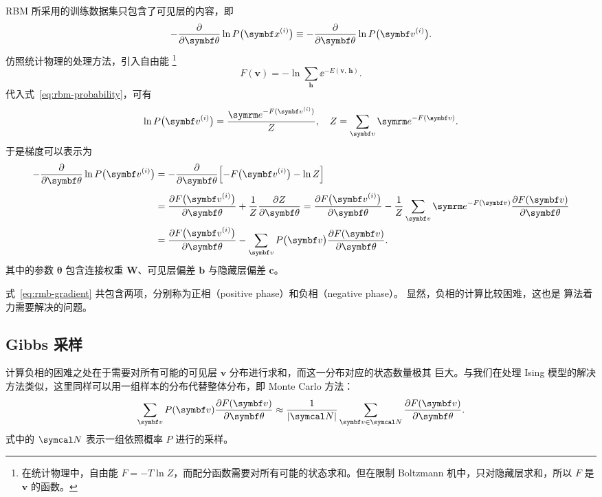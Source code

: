 RBM 所采用的训练数据集只包含了可见层的内容，即
\begin{equation}
  - \pdv{\bm{\theta}} \ln P\qty\big(\bm{x}^{(i)}) \equiv
  - \pdv{\bm{\theta}} \ln P\qty\big(\bm{v}^{(i)}).
\end{equation}
仿照统计物理的处理方法，引入自由能
\footnote{在统计物理中，自由能 $F=-T\ln Z$，而配分函数需要对所有可能的状态求和。但在限制
  Boltzmann 机中，只对隐藏层求和，所以 $F$ 是 $\bm{v}$ 的函数。}
\begin{equation}
  F(\bm{v}) = - \ln \sum_{\bm{h}} \ee^{-E(\bm{v},\,\bm{h})}.
\end{equation}
代入式~\eqref{eq:rbm-probability}，可有
\begin{equation}
  \ln P\qty\big(\bm{v}^{(i)}) = \frac{\ee^{-F(\bm{v}^{(i)})}}{Z} \qc
  Z = \sum_{\bm{v}} \ee^{-F(\bm{v})}.
\end{equation}
于是梯度可以表示为
\begin{align}
  \label{eq:rmb-gradient}
     - \pdv{\bm{\theta}} \ln P\qty\big(\bm{v}^{(i)})
  &= - \pdv{\bm{\theta}} \qty\Big[-F\qty\big(\bm{v}^{(i)}) - \ln Z]
     \vphantom{\sum_x} \notag \\
  &= \pdv{F\qty\big(\bm{v}^{(i)})}{\bm{\theta}} + \frac{1}{Z} \pdv{Z}{\bm{\theta}}
   = \pdv{F\qty\big(\bm{v}^{(i)})}{\bm{\theta}}
     - \frac{1}{Z} \sum_{\bm{v}} \ee^{-F(\bm{v})} \pdv{F(\bm{v})}{\bm{\theta}} \notag \\
  &= \pdv{F\qty\big(\bm{v}^{(i)})}{\bm{\theta}}
     - \sum_{\bm{v}} P\qty\big(\bm{v}) \pdv{F(\bm{v})}{\bm{\theta}}.
\end{align}
其中的参数 $\bm{\theta}$ 包含连接权重 $\bm{W}$、可见层偏差 $\bm{b}$ 与隐藏层偏差 $\bm{c}$。

式~\eqref{eq:rmb-gradient} 共包含两项，分别称为正相（positive phase）和负相（negative phase）。
显然，负相的计算比较困难，这也是 \CDk{} 算法着力需要解决的问题。

\subsection{Gibbs 采样}

计算负相的困难之处在于需要对所有可能的可见层 $\bm{v}$ 分布进行求和，而这一分布对应的状态数量极其
巨大。与我们在处理 Ising 模型的解决方法类似，这里同样可以用一组样本的分布代替整体分布，即 Monte
Carlo 方法：
\begin{equation}
  \sum_{\bm{v}} P(\bm{v}) \pdv{F(\bm{v})}{\bm{\theta}}
  \approx \frac{1}{\abs{\domN}} \sum_{\bm{v}\in\domN} \pdv{F(\bm{v})}{\bm{\theta}}.
\end{equation}
式中的 $\domN$ 表示一组依照概率 $P$ 进行的采样。

